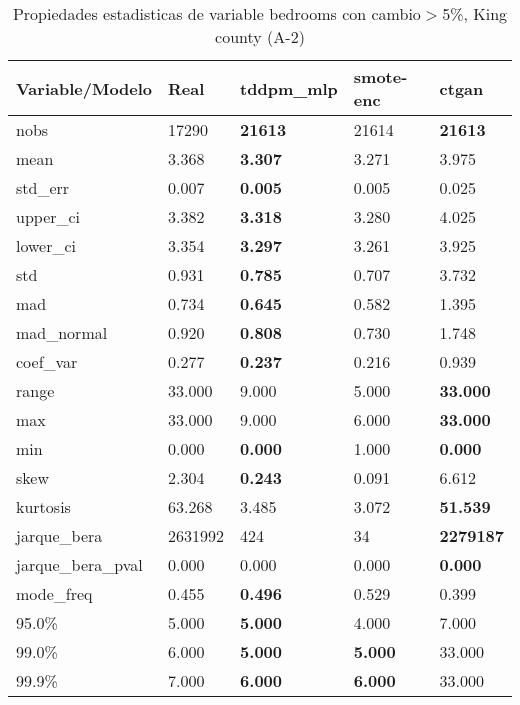 \begin{table}[H]
\centering
\fontsize{8}{14}\selectfont
\caption{Propiedades estadisticas de variable bedrooms con cambio\ensuremath{>}5\%, King county (A-2)}
\label{table-stats-king county-a-2-bedrooms-short}
\begin{tabular}{|l|m{10em}|m{10em}|m{10em}|m{10em}|}
\hline
 \rowcolor[gray]{0.8}
Variable/Modelo & Real & tddpm\_mlp & smote-enc & ctgan \\
\hline nobs & 17290 & \bfseries 21613 & \cellcolor[rgb]{0.9, 0.54, 0.52} 21614 & \bfseries 21613 \\
\hline mean & 3.368 & \bfseries 3.307 & 3.271 & \cellcolor[rgb]{0.9, 0.54, 0.52} 3.975 \\
\hline std\_err & 0.007 & \bfseries 0.005 & 0.005 & \cellcolor[rgb]{0.9, 0.54, 0.52} 0.025 \\
\hline upper\_ci & 3.382 & \bfseries 3.318 & 3.280 & \cellcolor[rgb]{0.9, 0.54, 0.52} 4.025 \\
\hline lower\_ci & 3.354 & \bfseries 3.297 & 3.261 & \cellcolor[rgb]{0.9, 0.54, 0.52} 3.925 \\
\hline std & 0.931 & \bfseries 0.785 & 0.707 & \cellcolor[rgb]{0.9, 0.54, 0.52} 3.732 \\
\hline mad & 0.734 & \bfseries 0.645 & 0.582 & \cellcolor[rgb]{0.9, 0.54, 0.52} 1.395 \\
\hline mad\_normal & 0.920 & \bfseries 0.808 & 0.730 & \cellcolor[rgb]{0.9, 0.54, 0.52} 1.748 \\
\hline coef\_var & 0.277 & \bfseries 0.237 & 0.216 & \cellcolor[rgb]{0.9, 0.54, 0.52} 0.939 \\
\hline range & 33.000 & 9.000 & \cellcolor[rgb]{0.9, 0.54, 0.52} 5.000 & \bfseries 33.000 \\
\hline max & 33.000 & 9.000 & \cellcolor[rgb]{0.9, 0.54, 0.52} 6.000 & \bfseries 33.000 \\
\hline min & 0.000 & \bfseries 0.000 & \cellcolor[rgb]{0.9, 0.54, 0.52} 1.000 & \bfseries 0.000 \\
\hline skew & 2.304 & \bfseries 0.243 & 0.091 & \cellcolor[rgb]{0.9, 0.54, 0.52} 6.612 \\
\hline kurtosis & 63.268 & 3.485 & \cellcolor[rgb]{0.9, 0.54, 0.52} 3.072 & \bfseries 51.539 \\
\hline jarque\_bera & 2631992 & 424 & \cellcolor[rgb]{0.9, 0.54, 0.52} 34 & \bfseries 2279187 \\
\hline jarque\_bera\_pval & 0.000 & 0.000 & \cellcolor[rgb]{0.9, 0.54, 0.52} 0.000 & \bfseries 0.000 \\
\hline mode\_freq & 0.455 & \bfseries 0.496 & \cellcolor[rgb]{0.9, 0.54, 0.52} 0.529 & 0.399 \\
\hline 95.0\% & 5.000 & \bfseries 5.000 & 4.000 & \cellcolor[rgb]{0.9, 0.54, 0.52} 7.000 \\
\hline 99.0\% & 6.000 & \bfseries 5.000 & \bfseries 5.000 & \cellcolor[rgb]{0.9, 0.54, 0.52} 33.000 \\
\hline 99.9\% & 7.000 & \bfseries 6.000 & \bfseries 6.000 & \cellcolor[rgb]{0.9, 0.54, 0.52} 33.000 \\
\hline
\end{tabular}
\end{table}
